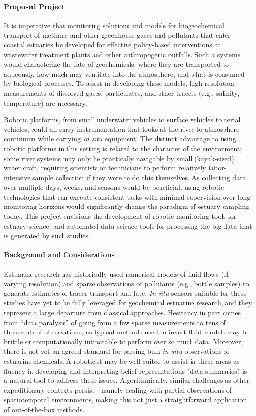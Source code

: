 \paragraph{Proposed Project}
It is imperative that monitoring solutions and models for biogeochemical transport of methane and other greenhouse gases and pollutants that enter coastal estuaries be developed for effective policy-based interventions at wastewater treatment plants and other anthropogenic outfalls. Such a systems would characterize the fate of geochemicals: where they are transported to aqueously, how much may ventilate into the atmosphere, and what is consumed by biological processes. To assist in developing these models, high-resolution measurements of dissolved gases, particulates, and other tracers (e.g., salinity, temperature) are necessary. 

Robotic platforms, from small underwater vehicles to surface vehicles to aerial vehicles, could all carry instrumentation that looks at the river-to-atmosphere continuum while carrying \emph{in situ} equipment. The distinct advantage to using robotic platforms in this setting is related to the character of the environment; some river systems may only be practically navigable by small (kayak-sized) water craft, requiring scientists or technicians to perform relatively labor-intensive sample collection if they were to do this themselves. As collecting data over multiple days, weeks, and seasons would be beneficial, using robotic technologies that can execute consistent tasks with minimal supervision over long monitoring horizons would significantly change the paradigm of estuary sampling today. This project envisions the development of robotic monitoring tools for estuary science, and automated data science tools for processing the big data that is generated by such studies.


\paragraph{Background and Considerations}
Estuarine research has historically used numerical models of fluid flows\autocite{geyer2014estuarine} (of varying resolution) and sparse observations of pollutants (e.g., bottle samples)\autocite{rheuban2019quantifying} to generate estimates of tracer transport and fate. \emph{In situ} sensors suitable for these studies have yet to be fully leveraged for geochemical estuarine research, and they represent a large departure from classical approaches. Hesitancy in part comes from ``data paralysis'' of going from a few sparse measurements to tens of thousands of observations, as typical methods used to invert fluid models may be brittle or computationally intractable to perform over so much data. Moreover, there is not yet an agreed standard for parsing bulk \emph{in situ} observations of estuarine chemicals. A roboticist may be well-suited to assist in these areas as fluency in developing and interpreting belief representations (data summaries) is a natural tool to address these issues. Algorithmically, similar challenges as other expeditionary contexts persist---namely dealing with partial observations of spatiotemporal environments, making this not just a straightforward application of out-of-the-box methods. 


